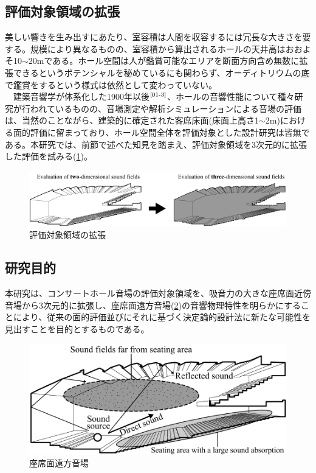 \newpage
\subsection{評価対象領域の拡張}
美しい響きを生み出すにあたり、室容積は人間を収容するには冗長な大きさを要する。規模により異なるものの、室容積から算出されるホールの天井高はおおよそ10$\sim$20mである。ホール空間は人が鑑賞可能なエリアを断面方向含め無数に拡張できるというポテンシャルを秘めているにも関わらず、オーディトリウムの底で鑑賞をするという様式は依然として変わっていない。
\\　建築音響学が体系化した1900年以後$^{\text{\cite{01-3}}}$、ホールの音響性能について種々研究が行われているものの、音場測定や解析シミュレーションによる音場の評価は、当然のことながら、建築的に確定された客席床面(床面上高さ1$\sim$2m)における面的評価に留まっており、ホール空間全体を評価対象とした設計研究は皆無である。本研究では、前節で述べた知見を踏まえ、評価対象領域を3次元的に拡張した評価を試みる(\ref{fig:評価対象領域の拡張})。
\\
\begin{figure}[h]
    \centering
    \includegraphics[keepaspectratio,scale=0.41]{01_att/evaluate_area.pdf}
    \caption{\hspace{1mm}評価対象領域の拡張}
    \label{fig:評価対象領域の拡張}
\end{figure}

\subsection{研究目的}
本研究は、コンサートホール音場の評価対象領域を、吸音力の大きな座席面近傍音場から3次元的に拡張し、座席面遠方音場(\ref{fig:座席面遠方音場})の音響物理特性を明らかにすることにより、従来の面的評価並びにそれに基づく決定論的設計法に新たな可能性を見出すことを目的とするものである。
\\
\begin{figure}[h]
    \centering
    \includegraphics[keepaspectratio,scale=0.8]{01_att/zasekimen_enpo_English.pdf}
    \caption{\hspace{1mm}座席面遠方音場}
    \label{fig:座席面遠方音場}
\end{figure}

